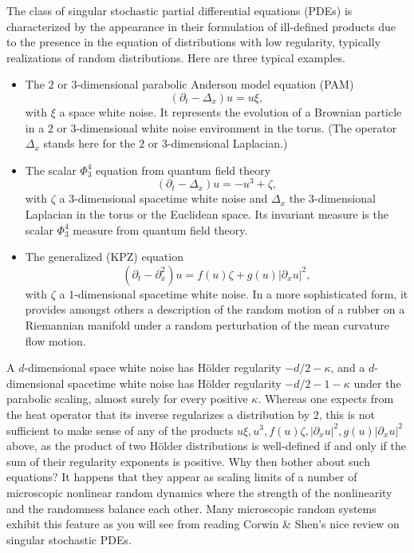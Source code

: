 \documentclass[10pt, reqno]{amsart}
\numberwithin{subsection}{section}
\numberwithin{subsubsection}{subsection}
\numberwithin{equation}{section} %
\theoremstyle{mystyle}
\theoremstyle{mystyle2}
\theoremstyle{mystyle3}
\begin{document}
The class of singular stochastic partial differential equations (PDEs) is 
characterized by the appearance in their formulation of ill-defined products due to the presence in the equation of distributions with low regularity, typically realizations of random distributions. Here are three typical examples.
\begin{itemize}
   \item[-] The $2$ or $3$-dimensional parabolic Anderson model equation (PAM)
   \begin{equation} \label{EqPAM}
   (\partial_t - \Delta_x)u = u\xi,
   \end{equation}
   with $\xi$ a space white noise. It represents the evolution of a Brownian particle in a $2$ or $3$-dimensional white noise environment in the torus. (The operator $\Delta_x$ stands here for the $2$ or $3$-dimensional 
Laplacian.)  \vspace{0.1cm}
      
   \item[-] The scalar $\Phi^4_3$ equation from quantum field theory
   \begin{equation} \label{EqPhi43}
   (\partial_t - \Delta_x)u = -u^3 + \zeta,
   \end{equation}
   with $\zeta$ a $3$-dimensional spacetime white noise and $\Delta_x$ the $3$-dimensional Laplacian in the torus or the Euclidean space. Its invariant measure is the scalar $\Phi^4_3$ measure from quantum field theory. 
  \vspace{0.1cm}
   
   \item[-] The generalized (KPZ) equation
   \begin{equation} \label{EqGKPZ}
   (\partial_t-\partial_x^2)u = f(u)\zeta + g(u)\vert\partial_x u\vert^2,
   \end{equation}
   with $\zeta$ a $1$-dimensional spacetime white noise. In a more sophisticated form, it provides amongst others a description of the random motion of a rubber on a Riemannian manifold under a random perturbation of the mean curvature flow motion.    \vspace{0.1cm}
\end{itemize}

A $d$-dimensional space white noise has H\"older regularity $-d/2-\kappa$, and a $d$-dimensional spacetime white noise has H\"older regularity $-d/2-1-\kappa$ under the parabolic scaling, almost surely for every positive $\kappa$. Whereas one expects from the heat operator that its inverse regularizes a distribution by $2$, this is not sufficient to make sense of 
any of the products $u\xi, u^3, f(u)\zeta, \vert\partial_x u\vert^2, g(u)\vert\partial_x u\vert^2$ above, as the product of two H\"older distributions is well-defined if and only if the sum of their regularity exponents 
is positive. Why then bother about such equations? It happens that they appear as scaling limits of a number of microscopic nonlinear random dynamics where the strength of the nonlinearity and the randomness balance each other. Many microscopic random systems exhibit this feature as you will 
see from reading Corwin \& Shen's nice review \cite{CorwinShen} on singular stochastic PDEs.
\end{document}
